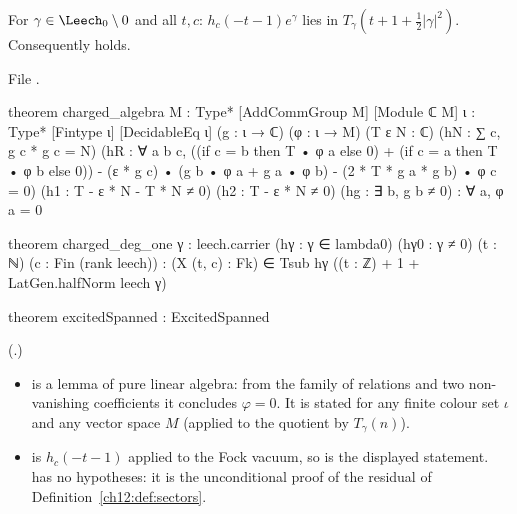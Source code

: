 \begin{theorem}\label{ch12:thm:charged}
For $\gamma\in\Leech_0\setminus0$ and all $t,c$: $h_c(-t-1)e^\gamma$ lies in $T_\gamma(t+1+\tfrac12|\gamma|^2)$.
Consequently  holds.
\end{theorem}
File .
\begin{leancode}
theorem charged_algebra {M : Type*} [AddCommGroup M] [Module ℂ M] {ι : Type*} [Fintype ι]
    [DecidableEq ι] (g : ι → ℂ) (φ : ι → M) (T ε N : ℂ) (hN : ∑ c, g c * g c = N)
    (hR : ∀ a b c, ((if c = b then T • φ a else 0) + (if c = a then T • φ b else 0))
      - (ε * g c) • (g b • φ a + g a • φ b) - (2 * T * g a * g b) • φ c = 0)
    (h1 : T - ε * N - T * N ≠ 0) (h2 : T - ε * N ≠ 0) (hg : ∃ b, g b ≠ 0) : ∀ a, φ a = 0

theorem charged_deg_one {γ : leech.carrier} (hγ : γ ∈ lambda0) (hγ0 : γ ≠ 0) (t : ℕ)
    (c : Fin (rank leech)) :
    (X (t, c) : Fk) ∈ Tsub hγ ((t : ℤ) + 1 + LatGen.halfNorm leech γ)

theorem excitedSpanned : ExcitedSpanned
\end{leancode}
(.)
\begin{dictionary}
\begin{itemize}
\item {} is a lemma of pure linear algebra: from the family of relations
   and two non-vanishing coefficients it concludes $\varphi=0$.  It is stated for any finite
  colour set $\iota$ and any vector space $M$ (applied to the quotient by $T_\gamma(n)$).
\item {} is $h_c(-t-1)$ applied to the Fock vacuum, so  is the
  displayed statement.   has no hypotheses: it is the unconditional
  proof of the residual of Definition~\ref{ch12:def:sectors}.
\end{itemize}
\end{dictionary}

